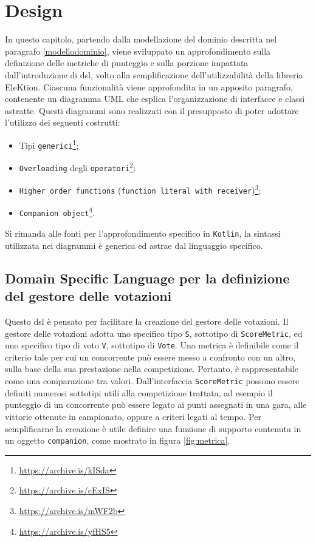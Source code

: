 \documentclass[12pt,a4paper,openright,twoside]{book}
\begin{document}
\chapter{Design}
\label{designdsl}
In questo capitolo, partendo dalla modellazione del dominio descritta nel paragrafo \ref{modellodominio}, 
viene sviluppato un approfondimento sulla definizione delle metriche di punteggio e sulla porzione
impattata dall'introduzione di \ac{dsl}, volto alla semplificazione dell'utilizzabilità della libreria EleKtion.
Ciascuna funzionalità viene approfondita in un apposito paragrafo, contenente un diagramma UML
che esplica l'organizzazione di interfacce e classi astratte.
Questi diagrammi sono realizzati con il presupposto di poter adottare l'utilizzo
dei seguenti costrutti:
\begin{itemize}
\item{Tipi \texttt{generici}\footnote{\url{https://archive.is/kISda}};}
\item{\texttt{Overloading} degli \texttt{operatori}\footnote{\url{https://archive.is/cExIS}};}
\item{\texttt{Higher order functions} (\texttt{function literal with receiver})\footnote{\url{https://archive.is/mWF2b}};}
\item{\texttt{Companion object}\footnote{\url{https://archive.is/yfHS5}}.}
\end{itemize}
Si rimanda alle fonti per l'approfondimento specifico in \texttt{Kotlin}, la sintassi utilizzata nei diagrammi
è generica ed astrae dal linguaggio specifico.
\section{Domain Specific Language per la definizione del gestore delle votazioni }
Questo \ac{dsl} è pensato per facilitare la creazione del gestore delle votazioni.
Il gestore delle votazioni adotta uno specifico tipo \texttt{S}, sottotipo di \texttt{ScoreMetric}, ed uno specifico
tipo di voto \texttt{V}, sottotipo di \texttt{Vote}.
Una metrica è definibile come il criterio tale per cui un concorrente può essere messo a confronto con un altro, sulla base della
sua prestazione nella competizione. Pertanto, è rappresentabile come una comparazione tra valori.
Dall'interfaccia \texttt{ScoreMetric} possono essere definiti numerosi sottotipi utili alla competizione trattata, ad esempio il punteggio di un concorrente
può essere legato ai punti assegnati in una gara, alle vittorie ottenute in campionato, oppure a criteri legati al tempo.
Per semplificarne la creazione è utile definire una funzione di supporto contenuta in un oggetto \texttt{companion}, come mostrato in figura \ref{fig:metrica}.
\end{document}
